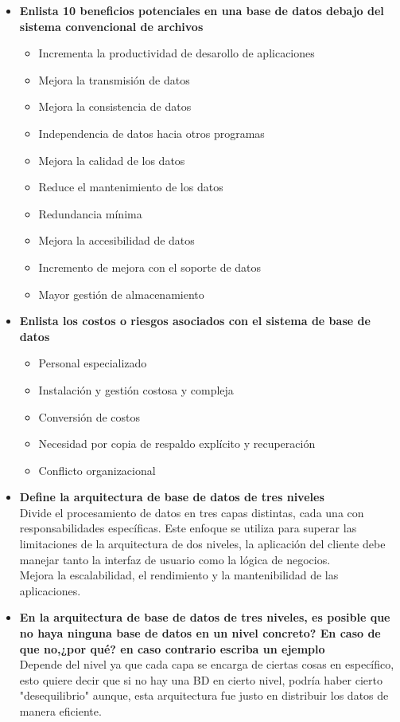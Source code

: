 \documentclass[letterpaper,12pt]{article}
\begin{document}
\begin{sloppypar}
\begin{itemize}
    \newpage
    \item \textbf{Enlista 10 beneficios potenciales en una base de datos debajo del sistema convencional de archivos}
    \begin{itemize}
        \item Incrementa la productividad de desarollo de aplicaciones
        \item Mejora la transmisión de datos
        \item Mejora la consistencia de datos
        \item Independencia de datos hacia otros programas
        \item Mejora la calidad de los datos
        \item Reduce el mantenimiento de los datos
        \item Redundancia mínima
        \item Mejora la accesibilidad de datos
        \item Incremento de mejora con el soporte de datos
        \item Mayor gestión de almacenamiento
    \end{itemize}
    \item \textbf{Enlista los costos o riesgos asociados con el sistema de base de datos}
    \begin{itemize}
        \item Personal especializado
        \item Instalación y gestión costosa y compleja
        \item Conversión de costos
        \item Necesidad por copia de respaldo explícito y recuperación
        \item Conflicto organizacional
    \end{itemize}
    \item \textbf{Define la arquitectura de base de datos de tres niveles} \\ Divide el procesamiento de datos en tres capas distintas, cada una con responsabilidades específicas. Este enfoque se utiliza para superar las limitaciones de la arquitectura de dos niveles, la aplicación del cliente debe manejar tanto la interfaz de usuario como la lógica de negocios. \\ Mejora la escalabilidad, el rendimiento y la mantenibilidad de las aplicaciones.
    \item \textbf{En la arquitectura de base de datos de tres niveles, es posible que no haya ninguna base de datos en un nivel concreto? En caso de que no,¿por qué? en caso contrario escriba un ejemplo}\\ Depende del nivel ya que cada capa se encarga de ciertas cosas en específico, esto quiere decir que si no hay una BD en cierto nivel, podría haber cierto "desequilibrio" aunque, esta arquitectura fue justo en distribuir los datos de manera eficiente.

\end{itemize}
\end{sloppypar}
\end{document}
